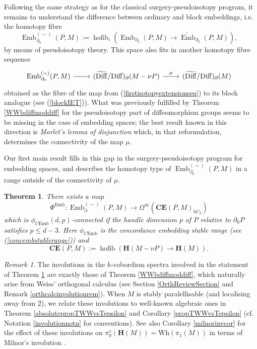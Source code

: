 \documentclass[a4paper, oneside]{amsart}
\newcommand{\diff}{\mathrm{Diff}}
\newcommand{\bdiff}{\widetilde{\mathrm{Diff}}}
\newcommand{\emb}{\operatorname{Emb}}
\newcommand{\bemb}{\widetilde{\operatorname{Emb}}}
\newcommand{\hofib}{\operatorname{hofib}}
\newcommand{\cemb}{C\mathrm{Emb}}
\newcommand{\1}{\mathds{1}}
\newtheorem{thmx}{Theorem}
\theoremstyle{remark}
\newtheorem{rem}[thm]{Remark}%
\theoremstyle{definition}
\newcommand{\Wh}{\mathrm{Wh}}
\newcommand{\Hsp}{\mathbf{H}}
\newcommand{\CEsp}{\mathbf{CE}}
\numberwithin{equation}{section}
\begin{document}
Following the same strategy as for the classical surgery-pseudoisotopy program, it remains to understand the difference between ordinary and block embeddings, i.e. the homotopy fibre
\begin{equation}\label{pseudoembdefn}
\emb^{(\sim)}_{\partial_0}(P,M):=\hofib_\iota(\emb_{\partial_0}(P,M)\to \bemb_{\partial_0}(P,M)),
\end{equation}
by means of pseudoisotopy theory. This space also fits in another homotopy fibre sequence
\begin{equation}\label{bdiffmoddiffisotopyextension}
\begin{tikzcd}
    \emb^{(\sim)}_{\partial_0}(P,M)\rar & (\bdiff/\diff)_\partial(M-\nu P)\rar["\mu"] & (\bdiff/\diff)_\partial(M)
\end{tikzcd}
\end{equation}
obtained as the fibre of the map from (\ref{firstisotopyextensionseq}) to its block analogue (see (\ref{blockIET})). What was previously fulfilled by Theorem \ref{WWbdiffmoddiff} for the pseudoisotopy part of diffeomorphism groups seems to be missing in the case of embedding spaces; the best result known in this direction is \textit{Morlet's lemma of disjunction} \cite[Thm. 3.1]{BurgLashRoth} which, in that reformulation, determines the connectivity of the map $\mu$. 

Our first main result fills in this gap in the surgery-pseudoisotopy program for embedding spaces, and describes the homotopy type of $\emb_{\partial_0}^{(\sim)}(P,M)$ in a range outside of the connectivity of $\mu$. 


\begin{thmx}\label{EmbWWIThm}
There exists a map 
$$
\Phi^{\emb}: \emb^{(\sim)}_\partial(P,M)\longrightarrow \Omega^{\infty}\left(\CEsp(P, M)_{hC_2}\right)
$$
which is $\phi_{\cemb}(d,p)$-connected if the handle dimension $p$ of $P$ relative to $\partial_0P$ satisfies $p\leq d-3$. Here $\phi_{\cemb}$ is the concordance embedding stable range (see (\ref{concembstablerange})) and
$$
\CEsp(P, M):=\operatorname{hofib}(\Hsp(M-\nu P)\to \Hsp(M)).
$$
\end{thmx}

\begin{rem}
The involutions in the $h$-cobordism spectra involved in the statement of Theorem \ref{EmbWWIThm} are exactly those of Theorem \ref{WWbdiffmoddiff}, which naturally arise from Weiss' orthogonal calculus (see Section \ref{OrthReviewSection} and Remark \ref{orthcalcinvolutionrem}). When $M$ is stably paralellisable (and localising away from $2$), we relate these involutions to well-known algebraic ones in Theorem \ref{absolutepropTWWvsTepsilon} and Corollary \ref{propTWWvsTepsilon} (cf. Notation \ref{involutionnotn} for conventions). See also Corollary \ref{milnorinvcor} for the effect of these involutions on $\pi_0^s(\Hsp(M))=\Wh(\pi_1(M))$ in terms of Milnor's involution \cite{MilnorWhiteheadTorsion}.
    
\end{rem}
\end{document}
